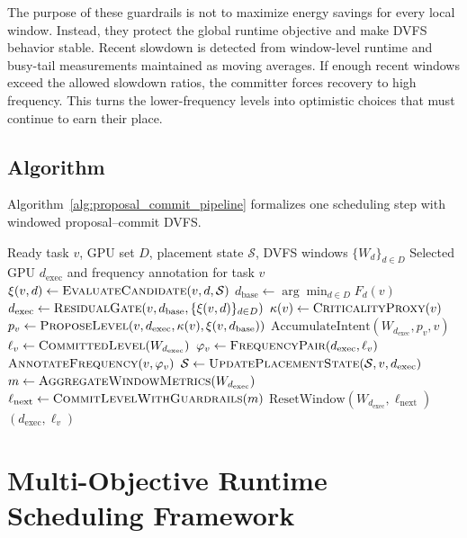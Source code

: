 The purpose of these guardrails is not to maximize energy savings for every local window. Instead, they protect the global runtime objective and make DVFS behavior stable. Recent slowdown is detected from window-level runtime and busy-tail measurements maintained as moving averages. If enough recent windows exceed the allowed slowdown ratios, the committer forces recovery to high frequency. This turns the lower-frequency levels into optimistic choices that must continue to earn their place.

\subsection{Algorithm}
\label{subsec:algorithm_proposal_commit}

Algorithm~\ref{alg:proposal_commit_pipeline} formalizes one scheduling step with windowed proposal--commit DVFS.

\begin{algorithm}[t]
\caption{Runtime scheduling with windowed proposal--commit DVFS}
\label{alg:proposal_commit_pipeline}
\begin{algorithmic}[1]
\Require Ready task $v$, GPU set $D$, placement state $\mathcal{S}$, DVFS windows $\{W_d\}_{d\in D}$
\Ensure Selected GPU $d_{\mathrm{exec}}$ and frequency annotation for task $v$
    \State $\xi(v,d) \gets \Call{EvaluateCandidate}{v,d,\mathcal{S}}$
\EndFor
\State $d_{\mathrm{base}} \gets \arg\min_{d\in D} F_d(v)$
\State $d_{\mathrm{exec}} \gets \Call{ResidualGate}{v,d_{\mathrm{base}},\{\xi(v,d)\}_{d\in D}}$
\State $\kappa(v) \gets \Call{CriticalityProxy}{v}$
\State $p_v \gets \Call{ProposeLevel}{v,d_{\mathrm{exec}},\kappa(v),\xi(v,d_{\mathrm{base}})}$
\State $\mathrm{AccumulateIntent}(W_{d_{\mathrm{exec}}},p_v,v)$
\State $\ell_v \gets \Call{CommittedLevel}{W_{d_{\mathrm{exec}}}}$
\State $\varphi_v \gets \Call{FrequencyPair}{d_{\mathrm{exec}},\ell_v}$
\State $\Call{AnnotateFrequency}{v,\varphi_v}$
\State $\mathcal{S} \gets \Call{UpdatePlacementState}{\mathcal{S},v,d_{\mathrm{exec}}}$
    \State $m \gets \Call{AggregateWindowMetrics}{W_{d_{\mathrm{exec}}}}$
    \State $\ell_{\mathrm{next}} \gets \Call{CommitLevelWithGuardrails}{m}$
    \State $\mathrm{ResetWindow}(W_{d_{\mathrm{exec}}},\ell_{\mathrm{next}})$
\EndIf
\State \Return $(d_{\mathrm{exec}},\ell_v)$
\end{algorithmic}
\end{algorithm}

\section{Multi-Objective Runtime Scheduling Framework}
\label{sec:theory_runtime_framework}

